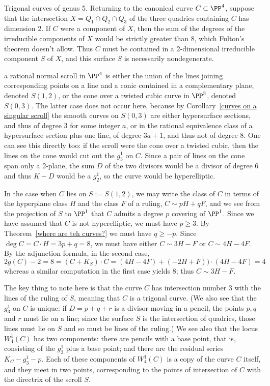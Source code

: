 \begin{exercise} Trigonal curves of genus 5.\label{trigonal genus 5} 
 Returning to the canonical curve $C \subset \PP^4$, suppose that the intersection $X = Q_1 \cap Q_2 \cap Q_3$ of the three quadrics containing $C$ has dimension 2. If $C$ were a component of $X$, then the sum of the degrees of the irreducible components of $X$ would be strictly greater than 8, which Fulton's theorem doesn't allow. Thus $C$ must be contained in a 2-dimensional irreducible component  $S$ of $X$, and this surface $S$ is necessarily nondegenerate. 

 a rational normal scroll in $\PP^4$ is either
 the union of the lines joining corresponding points on a line and a conic contained in a complementary plane, denoted $S(1,2)$, or the cone over a twisted cubic curve in $\PP^3$, denoted $S(0,3)$. The latter case does not occur here, because by Corollary~\ref{curves on a singular scroll} the smooth curves on $S(0,3)$ are either hypersurface sections, and thus of degree $3$ for
some integer $a$, or in the rational equivalence class of a hypersurface section plus one line,
of degree $3a+1$, and thus not of degree 8. One can see this directly too: if the scroll were the cone over
a twisted cubic, then the lines on the cone would cut out the $g^1_3$ on $C$. Since a pair of lines on the cone span
only a 2-plane, the sum $D$ of the two divisors would be a divisor of degree 6  and thus $K-D$ would be a $g^1_2$, 
so the curve would be hyperelliptic.

In the case when $C$ lies on $S := S(1,2)$, we may write the class of $C$ in terms of the hyperplane class $H$ and the class $F$ of a ruling, $C\sim pH+qF$, and we see from the 
projection of $S$ to $\PP^1$ that $C$ admits
a degree $p$ covering of $\PP^1$. Since we have assumed that $C$ is not hyperelliptic,
we must have $p\geq 3$. By Theorem~\ref{where are teh curves?} we must have
$q\geq -p$. Since $\deg C = C\cdot H = 3p+q = 8$, we must have either 
$C\sim 3H-F$ or $C\sim 4H-4F$. By the adjunction formula, in the second case,
$$
2g(C)-2 = 8 = (C+K_S)\cdot C = (4H-4F)+(-2H+F))\cdot(4H-4F) =4
$$
whereas a similar computation in the first case yields 8; thus $C\sim 3H-F$.

The key thing to note here is that the curve $C$ has intersection number 3 with the lines of the ruling of $S$, meaning that $C$ is a trigonal curve. (We also see that the $g^1_3$ on $C$ is unique: if $D = p + q + r$ is a divisor moving in a pencil, the points $p, q$ and $r$ must lie on a line; since the surface $S$ is the intersection of quadrics, those lines must lie on $S$ and so must be  lines  of the ruling.) We see also that the locus $W^1_4(C)$ has two components: there are pencils with a base point, that is, consisting of the $g^1_3$ plus a base point; and there are the residual series $K_C - g^1_3 - p$. Each of these components of $W^1_4(C)$ is a copy of the curve $C$ itself, and they meet in two points, corresponding to the points of intersection of $C$ with the directrix of the scroll $S$.
\end{exercise}

